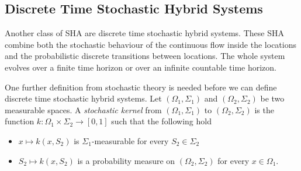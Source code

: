 \subsection{Discrete Time Stochastic Hybrid Systems}
Another class of SHA are discrete time stochastic hybrid systems. These SHA combine both the stochastic behaviour of the continuous flow inside the locations and the probabilistic discrete transitions between locations. The whole system evolves over a finite time horizon or over an infinite countable time horizon.

One further definition from stochastic theory is needed before we can define discrete time stochastic hybrid systems.
Let $(\Omega_{1},\Sigma_{1})$ and $(\Omega_{2},\Sigma_{2})$ be two measurable spaces. A \emph{stochastic kernel} from $(\Omega_{1},\Sigma_{1})$ to $(\Omega_{2},\Sigma_{2})$ is the function
$k: \Omega_{1}\times\Sigma_{2}\rightarrow[0,1]$ such that the following hold
\begin{itemize}
    \item $x\mapsto k(x,S_{2})$ is $\Sigma_{1}$-measurable for every $S_{2}\in\Sigma_{2}$
    \item $S_{2}\mapsto k(x,S_{2})$ is a probability measure on $(\Omega_{2},\Sigma_{2})$ for every $x\in\Omega_{1}$.
\end{itemize}

